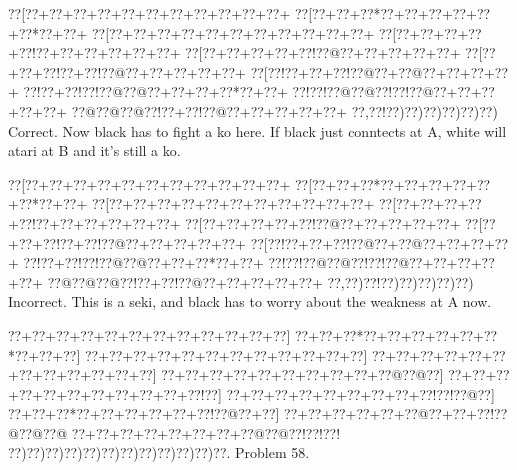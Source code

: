 \documentclass[a5paper]{article}
\begin{document}
\begin{center}
{\goo
\0??[\0??+\0??+\0??+\0??+\0??+\0??+\0??+\0??+\0??+\0??+\0??+
\0??[\0??+\0??+\0??*\0??+\0??+\0??+\0??+\0??+\0??*\0??+\0??+
\0??[\0??+\0??+\0??+\0??+\0??+\0??+\0??+\0??+\0??+\0??+\0??+
\0??[\0??+\0??+\0??+\0??+\0??!\0??+\0??+\0??+\0??+\0??+\0??+
\0??[\0??+\0??+\0??+\0??+\0??!\0??@\0??+\0??+\0??+\0??+\0??+
\0??[\0??+\0??+\0??!\0??+\0??!\0??@\0??+\0??+\0??+\0??+\0??+
\0??[\0??!\0??+\0??+\0??!\0??@\0??+\0??@\0??+\0??+\0??+\0??+
\0??!\0??+\0??!\0??!\0??@\0??@\0??+\0??+\0??+\0??*\0??+\0??+
\0??!\0??!\0??@\0??@\0??!\0??!\0??@\0??+\0??+\0??+\0??+\0??+
\0??@\0??@\0??@\0??!\0??+\0??!\0??@\0??+\0??+\0??+\0??+\0??+
\0??,\0??!\0??)\0??)\0??)\0??)\0??)\0??)
}
Correct. Now black has to fight a ko here. If black just conntects at A, white will atari at B and it's still a ko.

\end{center}
\begin{center}
{\goo
\0??[\0??+\0??+\0??+\0??+\0??+\0??+\0??+\0??+\0??+\0??+\0??+
\0??[\0??+\0??+\0??*\0??+\0??+\0??+\0??+\0??+\0??*\0??+\0??+
\0??[\0??+\0??+\0??+\0??+\0??+\0??+\0??+\0??+\0??+\0??+\0??+
\0??[\0??+\0??+\0??+\0??+\0??!\0??+\0??+\0??+\0??+\0??+\0??+
\0??[\0??+\0??+\0??+\0??+\0??!\0??@\0??+\0??+\0??+\0??+\0??+
\0??[\0??+\0??+\0??!\0??+\0??!\0??@\0??+\0??+\0??+\0??+\0??+
\0??[\0??!\0??+\0??+\0??!\0??@\0??+\0??@\0??+\0??+\0??+\0??+
\0??!\0??+\0??!\0??!\0??@\0??@\0??+\0??+\0??*\0??+\0??+
\0??!\0??!\0??@\0??@\0??!\0??!\0??@\0??+\0??+\0??+\0??+\0??+
\0??@\0??@\0??@\0??!\0??+\0??!\0??@\0??+\0??+\0??+\0??+\0??+
\0??,\0??)\0??!\0??)\0??)\0??)\0??)\0??)
}
Incorrect. This is a seki, and black has to worry about the weakness at A now.

\end{center}
\newpage
\begin{center}
{\goo
\0??+\0??+\0??+\0??+\0??+\0??+\0??+\0??+\0??+\0??+\0??+\0??]
\0??+\0??+\0??*\0??+\0??+\0??+\0??+\0??+\0??*\0??+\0??+\0??]
\0??+\0??+\0??+\0??+\0??+\0??+\0??+\0??+\0??+\0??+\0??+\0??]
\0??+\0??+\0??+\0??+\0??+\0??+\0??+\0??+\0??+\0??+\0??+\0??]
\0??+\0??+\0??+\0??+\0??+\0??+\0??+\0??+\0??+\0??@\0??@\0??]
\0??+\0??+\0??+\0??+\0??+\0??+\0??+\0??+\0??+\0??+\0??!\0??]
\0??+\0??+\0??+\0??+\0??+\0??+\0??+\0??+\0??!\0??!\0??@\0??]
\0??+\0??+\0??*\0??+\0??+\0??+\0??+\0??+\0??!\0??@\0??+\0??]
\0??+\0??+\0??+\0??+\0??+\0??@\0??+\0??+\0??!\0??@\0??@\0??@
\0??+\0??+\0??+\0??+\0??+\0??+\0??+\0??@\0??@\0??!\0??!\0??!
\0??)\0??)\0??)\0??)\0??)\0??)\0??)\0??)\0??)\0??)\0??)\0??.
}
Problem 58.

\end{center}
\end{document}
